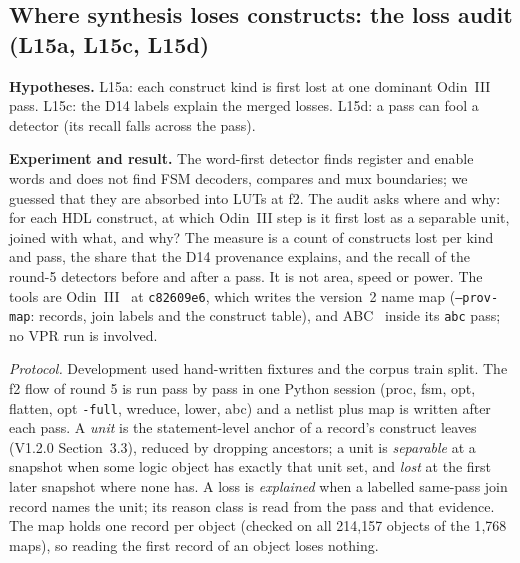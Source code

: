 \documentclass[conference]{IEEEtran}
\newcommand{\hev}[1]{\par\smallskip\noindent\textbf{#1}}
\newcommand{\code}[1]{\texttt{#1}}
\begin{document}
\subsection{Where synthesis loses constructs: the loss audit (L15a, L15c, L15d)}
\label{sec:round6}

\hev{Hypotheses.} L15a: each construct kind is first lost at one dominant Odin~III pass. L15c: the D14 labels
explain the merged losses. L15d: a pass can fool a detector (its recall falls across the pass).











\hev{Experiment and result.} The word-first detector finds register and enable words and does not find FSM decoders, compares and mux boundaries; we guessed that they are absorbed into LUTs at f2. The audit asks where and why: for each HDL construct, at which Odin~III step is it first lost as a separable unit, joined with what, and why? The measure is a count of
constructs lost per kind and pass, the share that the D14 provenance explains, and the recall
of the round-5 detectors before and after a pass. It is not area, speed or power. The tools
are Odin~III~\cite{odinII} at \code{c82609e6}, which writes the version~2 name map
(\code{--prov-map}: records, join labels and the construct table), and ABC~\cite{abc} inside
its \code{abc} pass; no VPR run is involved.

\emph{Protocol.} Development used hand-written fixtures and the corpus train split. The f2 flow of round 5 is run
pass by pass in one Python session (proc, fsm, opt, flatten, opt \code{-full}, wreduce, lower,
abc) and a netlist plus map is written after each pass. A \emph{unit} is the statement-level
anchor of a record's construct leaves (V1.2.0 Section~3.3), reduced by dropping ancestors; a unit is
\emph{separable} at a snapshot when some logic object has exactly that unit set, and \emph{lost}
at the first later snapshot where none has. A loss is \emph{explained} when a labelled same-pass
join record names the unit; its reason class is read from the pass and that evidence. The map
holds one record per object (checked on all 214{,}157 objects of the 1{,}768 maps), so reading the
first record of an object loses nothing.
\end{document}
